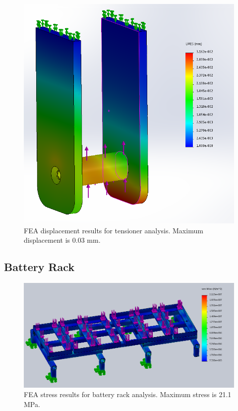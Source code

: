 \begin{figure}[H]
\centering
\includegraphics[width=\textwidth]{images/tensioner_displacement_fea}
\caption[Tensioner FEA Displacement Results]{FEA displacement results for tensioner analysis. Maximum displacement is 0.03 mm.}
\label{fig:idler_fea2}
\end{figure}

\subsection{Battery Rack}\label{sec:br_fea}

\begin{figure}[H]
\centering
\includegraphics[width=\textwidth]{images/updated_battery_rack_VM}
\caption[Battery Rack FEA Stress Results]{FEA stress results for battery rack analysis. Maximum stress is 21.1 MPa.}
\label{fig:battery_rack_stress_fea}
\end{figure}

